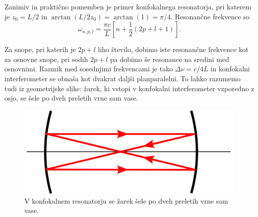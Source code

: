 Zanimiv in praktično pomemben je primer konfokalnega resonatorja,
pri katerem je $z_{0}=L/2$ in $\arctan(L/2z_{0})= \arctan(1)=\pi/4$. Resonančne frekvence
so 
\begin{equation}
\omega_{n,p,l}=\frac{\pi c}{L}\left[n+\frac{1}{2}(2p+l+1)\right].
\label{eq:omega_konf}
\end{equation}

Za snope, pri katerih je $2p+l$ liho število, dobimo iste resonančne frekvence kot
za osnovne snope, pri sodih $2p+l$ pa dobimo še resonance na sredini
med osnovnimi. Razmik med sosednjimi frekvencami je tako $\Delta\nu=c/4L$
in konfokalni interferometer se obnaša kot dvakrat daljši planparalelni.
To lahko razumemo tudi iz geometrijske slike: žarek, ki vstopi v konfokalni
interferometer vzporedno z osjo, se šele po dveh preletih vrne sam
vase.

\begin{figure}[h]
\centering
\includegraphics[width=6truecm]{slike/04_Konfokalni.png}
\caption{V konfokalnem resonatorju se žarek šele po dveh preletih
vrne sam vase.}
\label{fig:Konfokalni_zarek}
\end{figure}

